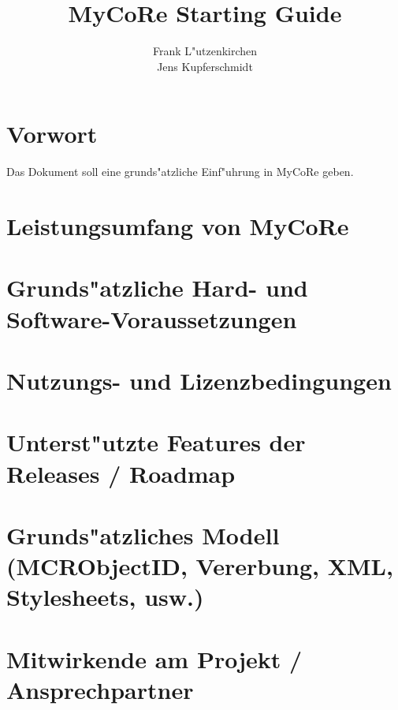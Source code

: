 \documentclass[a4paper,12pt]{book}
\begin{document}
\title{MyCoRe Starting Guide}
\author{
    Frank L"utzenkirchen\\
    Jens Kupferschmidt}
\maketitle
\setcounter{secnumdepth}{10}
\chapter*{Vorwort}
Das Dokument soll eine grunds"atzliche Einf"uhrung in MyCoRe geben.

\tableofcontents
\listoffigures
\listoftables
\chapter{Leistungsumfang von MyCoRe}
\chapter{Grunds"atzliche Hard- und Software-Voraussetzungen}
\chapter{Nutzungs- und Lizenzbedingungen}
\chapter{Unterst"utzte Features der Releases / Roadmap}
\chapter{Grunds"atzliches Modell (MCRObjectID, Vererbung, XML, Stylesheets, usw.)}
\chapter{Mitwirkende am Projekt / Ansprechpartner}

\end{document}
